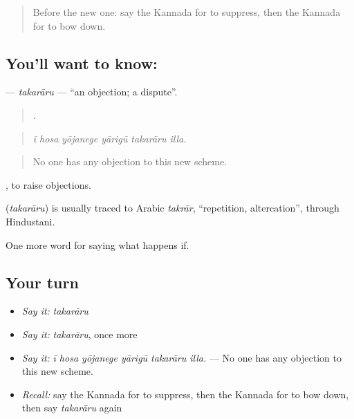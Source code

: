 \label{lesson:KA-C432-takararu}



\begin{quote}
Before the new one: say the Kannada for to suppress, then the Kannada for to bow down.
\end{quote}

\subsection*{You'll want to know: }
\textbf{} — \emph{takarāru} — \textquotedblleft{}an objection; a dispute\textquotedblright{}.

\begin{quote}
     .
\end{quote}

\begin{quote}
\emph{ī hosa yōjanege yārigū takarāru illa.}
\end{quote}

\begin{quote}
No one has any objection to this new scheme.
\end{quote}

 , to raise objections.

\begin{cousinweb}
\textbf{} (\emph{takarāru}) is usually traced to Arabic \emph{takrār}, \textquotedblleft{}repetition, altercation\textquotedblright{}, through Hindustani.
\end{cousinweb}

\begin{grammarlens}[title={What you've built}]
One more word for saying what happens if.
\end{grammarlens}

\subsection*{Your turn}
\begin{itemize}
\raggedright
  \item \emph{Say it:} \emph{takarāru}
  \item \emph{Say it:} \emph{takarāru}, once more
  \item \emph{Say it:} \emph{ī hosa yōjanege yārigū takarāru illa.} — No one has any objection to this new scheme.
  \item \emph{Recall:} say the Kannada for to suppress, then the Kannada for to bow down, then say \emph{takarāru} again
\end{itemize}

